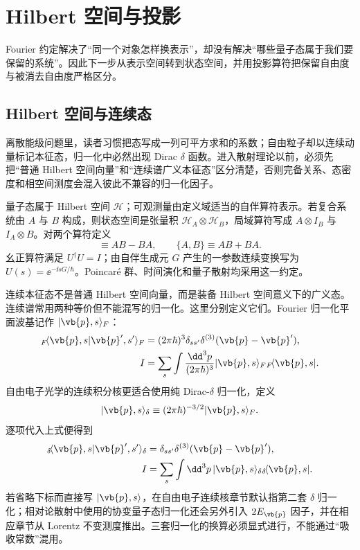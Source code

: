 



\section{Hilbert 空间与投影}

Fourier 约定解决了“同一个对象怎样换表示”，却没有解决“哪些量子态属于我们要保留的系统”。因此下一步从表示空间转到状态空间，并用投影算符把保留自由度与被消去自由度严格区分。

\subsection{Hilbert 空间与连续态}
离散能级问题里，读者习惯把态写成一列可平方求和的系数；自由粒子却以连续动量标记本征态，归一化中必然出现 Dirac $\delta$ 函数。进入散射理论以前，必须先把“普通 Hilbert 空间向量”和“连续谱广义本征态”区分清楚，否则完备关系、态密度和相空间测度会混入彼此不兼容的归一化因子。

量子态属于 Hilbert 空间 $\mathcal H$；可观测量由定义域适当的自伴算符表示。若复合系统由 $A$ 与 $B$ 构成，则状态空间是张量积 $\mathcal H_A\otimes\mathcal H_B$，局域算符写成 $A\otimes I_B$ 与 $I_A\otimes B$。对两个算符定义
\begin{equation*}
[A,B]\equiv AB-BA,
\qquad
\{A,B\}\equiv AB+BA.
\end{equation*}
幺正算符满足 $U^\dagger U=I$；由自伴生成元 $G$ 产生的一参数连续变换写为 $U(s)=\ee^{-\ii sG/\hbar}$。Poincar\'e 群、时间演化和量子散射均采用这一约定。

连续本征态不是普通 Hilbert 空间向量，而是装备 Hilbert 空间意义下的广义态。连续谱常用两种等价但不能混写的归一化。这里分别定义它们。Fourier 归一化平面波基记作 $|\vb{p},s\rangle_F$：
\begin{align}
{}_F\!\langle\vb{p},s|\vb{p}',s'\rangle_F
&=(2\pi\hbar)^3\delta_{ss'}\delta^{(3)}(\vb{p}-\vb{p}'),\\
I&=\sum_s\int\frac{\dd^3 p}{(2\pi\hbar)^3}
|\vb{p},s\rangle_F{}_F\!\langle\vb{p},s|.
\label{eq:global-continuum-normalization-fourier}
\end{align}
自由电子光学的连续积分核更适合使用纯 Dirac-$\delta$ 归一化，定义
\begin{equation}
|\vb{p},s\rangle_\delta
\equiv(2\pi\hbar)^{-3/2}|\vb{p},s\rangle_F.
\label{eq:delta-normalized-state-definition}
\end{equation}
逐项代入上式便得到
\begin{align}
{}_{\delta}\!\langle\vb{p},s|\vb{p}',s'\rangle_{\delta}
&=\delta_{ss'}\delta^{(3)}(\vb{p}-\vb{p}'),\\
I&=\sum_s\int \dd^3 p\,
|\vb{p},s\rangle_\delta{}_{\delta}\!\langle\vb{p},s|.
\label{eq:global-continuum-normalization-delta}
\end{align}
若省略下标而直接写 $|\vb{p},s\rangle$，在自由电子连续核章节默认指第二套 $\delta$ 归一化；相对论散射中使用的协变量子态归一化还会另外引入 $2E_{\vb{p}}$ 因子，并在相应章节从 Lorentz 不变测度推出。三套归一化的换算必须显式进行，不能通过“吸收常数”混用。

